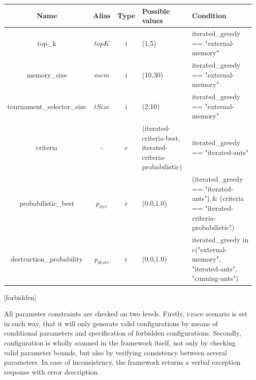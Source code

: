 \documentclass[11pt,a4paper,oneside]{book}
\begin{document}
\begin{table}[]
\centering
\begin{tabular}{|c|c|c|p{4cm}|p{4cm}|}
\hline
\textbf{Name}  & \textbf{Alias}      & \textbf{Type} & \textbf{Possible values}                                                                & \textbf{Condition}                                                                                     \\ \hline
top\_k                          & $topK$     & i    & (1,5)                                                                          & iterated\_greedy == "external-memory"                                                         \\ \hline
memory\_size                    & $mem$      & i    & (10,30)                                                                        & iterated\_greedy == "external-memory"                                                         \\ \hline
tournament\_selector\_size      & $tSize$    & i    & (2,10)                                                                         & iterated\_greedy == "external-memory"                                                         \\ \hline
criteria                        & -          & c    & (iterated-criteria-best, iterated-criteria-probabilistic)                       & iterated\_greedy	== "iterated-ants"                                                           \\ \hline
probabilistic\_best             & $p_{iter}$ & r    & (0.0,1.0)                                                                      & (iterated\_greedy == "iterated-ants") \& (criteria == "iterated-criteria-probabilistic")       \\ \hline
destruction\_probability        & $p_{destr}$  &  r & (0.0,1.0)                                                                      & iterated\_greedy in c("external-memory", "iterated-ants", "cunning-ants")                     \\ \hline
\end{tabular}
\end{table}



[forbidden]


All parameter constraints are checked on two levels. Firstly, i-race scenario is set in such way, that it will only generate valid configurations by means of conditional parameters and specification of forbidden configurations. Secondly, configuration is wholly scanned in the framework itself, not only by checking valid parameter bounds, but also by verifying consistency between several parameters. In case of inconsistency, the framework returns a verbal exception response with error description.
\end{document}

